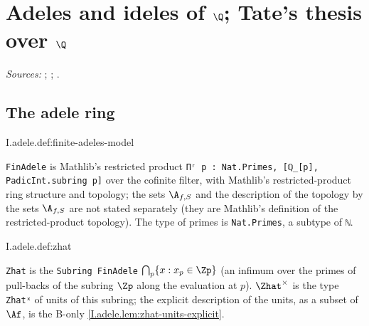 
\chapter{\texorpdfstring{Adeles and ideles of $\Q$; Tate's thesis over $\Q$}{Adeles and ideles of ℚ; Tate's thesis over ℚ}}\label{ch:ch-0-03-adeles}

\noindent\emph{Sources:} \cite{Corv-ptIII-1}; \cite{GH}; \cite[§2]{AIntro}.

\section{The adele ring}

\begin{definition}
\end{definition}
\begin{tfformal}{I.adele.def:finite-adeles-model}
\begin{tffidelity}
\texttt{FinAdele} is Mathlib's restricted product \texttt{Πʳ p : Nat.Primes, [ℚ\_[p], PadicInt.subring p]} over the cofinite filter, with Mathlib's restricted-product ring structure and topology; the sets $\A_{f,S}$ and the description of the topology by the sets $\A_{f,S}$ are not stated separately (they are Mathlib's definition of the restricted-product topology). The type of primes is \texttt{Nat.Primes}, a subtype of \texttt{ℕ}.
\end{tffidelity}
\end{tfformal}

\begin{definition}
\end{definition}
\begin{tfformal}{I.adele.def:zhat}
\begin{tffidelity}
\texttt{Zhat} is the \texttt{Subring FinAdele} $\bigcap_p\{x:x_p\in\Zp\}$ (an infimum over the primes of pull-backs of the subring $\Zp$ along the evaluation at $p$). $\Zhat^\times$ is the type \texttt{Zhatˣ} of units of this subring; the explicit description of the units, as a subset of $\Af$, is the B-only \cref{I.adele.lem:zhat-units-explicit}.
\end{tffidelity}
\end{tfformal}

